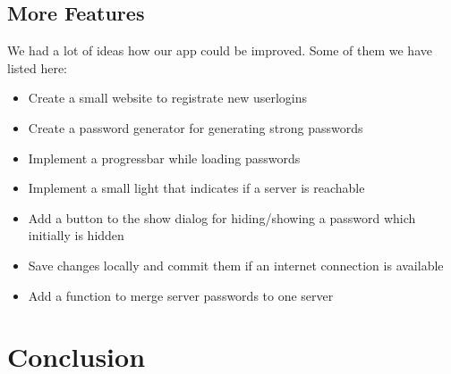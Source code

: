 \documentclass{report}
\begin{document}
\subsection{More Features}
We had a lot of ideas how our app could be improved. Some of them we have listed here:
\begin{itemize}
         \item Create a small website to registrate new userlogins
         \item Create a password generator for generating strong passwords
         \item Implement a progressbar while loading passwords
         \item Implement a small light that indicates if a server is reachable
         \item Add a button to the show dialog for hiding/showing a password which initially is hidden
         \item Save changes locally and commit them if an internet connection is available
         \item Add a function to merge server passwords to one server
      \end{itemize}
 
\subsection{}

\section{Conclusion}




\end{document}
